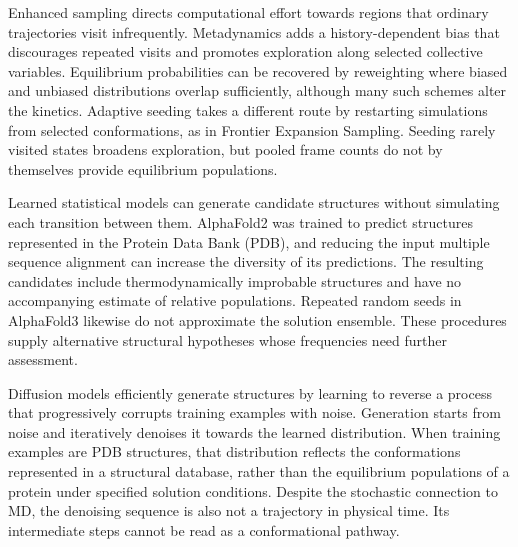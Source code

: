 Enhanced sampling directs computational effort towards regions that ordinary trajectories visit infrequently. Metadynamics adds a history-dependent bias that discourages repeated visits and promotes exploration along selected collective variables.\supercite{barducciMetadynamics2011} Equilibrium probabilities can be recovered by reweighting where biased and unbiased distributions overlap sufficiently, although many such schemes alter the kinetics.\supercite{heninEnhancedSamplingMethods2022} Adaptive seeding takes a different route by restarting simulations from selected conformations, as in Frontier Expansion Sampling.\supercite{zhangFrontierExpansionSampling2020} Seeding rarely visited states broadens exploration, but pooled frame counts do not by themselves provide equilibrium populations.\supercite{heninEnhancedSamplingMethods2022}

Learned statistical models can generate candidate structures without simulating each transition between them. AlphaFold2 was trained to predict structures represented in the Protein Data Bank (PDB),\supercite{jumperHighlyAccurateProtein2021} and reducing the input multiple sequence alignment can increase the diversity of its predictions. The resulting candidates include thermodynamically improbable structures and have no accompanying estimate of relative populations.\supercite{vaniAlphaFold2RAVESequenceBoltzmann2023} Repeated random seeds in AlphaFold3 likewise do not approximate the solution ensemble.\supercite{abramsonAccurateStructurePrediction2024} These procedures supply alternative structural hypotheses whose frequencies need further assessment.

Diffusion models efficiently generate structures by learning to reverse a process that progressively corrupts training examples with noise. Generation starts from noise and iteratively denoises it towards the learned distribution.\supercite{yimDiffusionModelsProtein2024} When training examples are PDB structures, that distribution reflects the conformations represented in a structural database, rather than the equilibrium populations of a protein under specified solution conditions.\supercite{wangProteinConformationGeneration2024} Despite the stochastic connection to MD, the denoising sequence is also not a trajectory in physical time. Its intermediate steps cannot be read as a conformational pathway.

